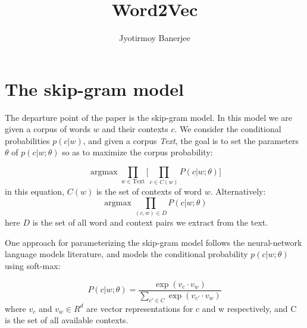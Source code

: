 \documentclass{article}
\title{Word2Vec}
\author{Jyotirmoy Banerjee}
\DeclareMathOperator*{\argmax}{argmax}
\begin{document}
\maketitle


\section{The skip-gram model}
The departure point of the paper is the skip-gram model. In this model we are
given a corpus of words $w$ and their contexts $c$. We consider the conditional
probabilities $p(c|w)$, and given a corpus \emph{Text}, the goal is to set the parameters
$\theta$ of $p(c|w; \theta)$ so as to maximize the corpus probability:

\begin{equation}
\argmax \prod_{w \in \text{Text}} \Bigg[ \prod_{c \in C(w)} P(c|w;\theta) \Bigg]
\end{equation}
in this equation, $C(w)$ is the set of contexts of word $w$. Alternatively:
\begin{equation}
\argmax \prod_{(c,w) \in D} P(c|w;\theta)
\end{equation}
here $D$ is the set of all word and context pairs we extract from the text.

One approach for parameterizing the skip-gram model follows the neural-network
language models literature, and models the conditional probability $p(c|w; \theta)$ using soft-max:

\begin{equation}
 P(c|w;\theta) = \frac{\exp(v_c \cdot v_w)}{\sum_{c' \in C} \exp({v_{c'} \cdot v_w})}
\end{equation}
where $v_c$ and $v_w \in R^d$ are vector representations for c and w respectively, and C is the set of all available contexts.
\end{document}
